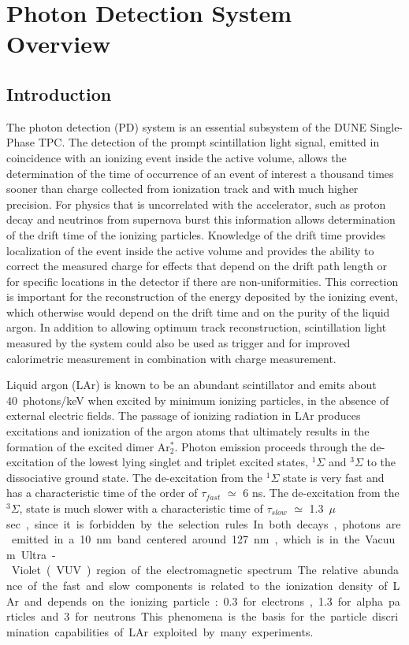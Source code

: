 \section{Photon Detection System Overview}
\label{sec:fdsp-pd-ov}

\subsection{Introduction}
\label{sec:fdsp-pd-intro}

The photon detection (PD) system is an essential subsystem of the DUNE Single-Phase TPC. The detection of the prompt scintillation light signal, emitted in coincidence with an ionizing event inside the active volume, allows the determination of the time of occurrence of an event of interest a thousand times sooner than charge collected from ionization track and with much higher precision. For physics that is uncorrelated with the accelerator, such as proton decay and neutrinos from supernova burst  this information allows determination of the drift time of the ionizing particles.
Knowledge of the drift time provides localization of the event inside the active volume and provides the ability to correct the measured charge for  effects that depend on the drift path length or for specific locations in the detector if there are non-uniformities.  This correction is important for the reconstruction of the energy deposited by the ionizing event, which otherwise would depend on the drift time and on the purity of the liquid argon. In addition to allowing optimum track reconstruction, scintillation light measured by the system could also be used as trigger and for improved calorimetric measurement in combination with charge measurement.

Liquid argon (LAr) is known to be an abundant scintillator and emits about \SI{40}{photons/keV} when excited  by minimum ionizing particles\cite{lar-scint}, in the absence of external electric fields. The passage of ionizing radiation in LAr produces excitations and ionization of the argon atoms that ultimately results in the formation of the 
excited dimer Ar$^*_2$.  Photon emission proceeds through the de-excitation 
of the lowest lying singlet and triplet excited states, $^{1}\Sigma$ and 
$^{3}\Sigma$ to the dissociative ground state. The de-excitation from the 
$^{1}\Sigma$ state is very fast and has a characteristic time of the order of 
$\tau_{fast}$ $\simeq$ 6 ns. The de-excitation from the $^{3}\Sigma$, state is 
much slower with a characteristic time of $\tau_{slow}$ $\simeq$ \SI{1.3}{$\mu$sec}, 
since it is forbidden by the selection rules. 
In both decays, photons are emitted in a \SI{10}{nm} band centered around \SI{127}{nm}, which is in 
the Vacuum Ultra-Violet (VUV) region of the electromagnetic spectrum.
The relative abundance of the  fast and slow components is related to the ionization density of LAr and 
depends on the ionizing particle: \num{0.3} for electrons, \num{1.3} for alpha 
particles and \num{3} for neutrons. This phenomena is the basis for the  
particle discrimination capabilities of LAr exploited by many 
experiments.

